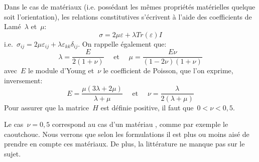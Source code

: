 \medskip
Dans le cas de matériaux  (i.e. possédant les mêmes
propriétés matérielles quelque soit l'orientation), les relations constitutives s'écrivent
à l'aide des coefficients de Lamé~$\lambda$ et~$\mu$:
\begin{equation}\sigma = 2\mu\varepsilon+\lambda Tr(\varepsilon)I\end{equation}
i.e.~$\sigma_{ij}=2\mu\varepsilon_{ij}+\lambda\varepsilon_{kk}\delta_{ij}$.
On rappelle également que:
\begin{equation}\lambda=\dfrac{E}{2(1+\nu)} \quad \text{ et } \quad \mu=\dfrac{E\nu}{(1-2\nu)(1+\nu)}
\end{equation}
avec~$E$ le module d'Young et~$\nu$ le coefficient de Poisson, que l'on exprime, inversement:
\begin{equation}
E=\dfrac{\mu(3\lambda+2\mu)}{\lambda+\mu} \quad\text{ et }\quad
\nu=\dfrac{\lambda}{2(\lambda+\mu)}
\end{equation}
Pour assurer que la matrice~$H$ est définie positive, il faut que~$0<\nu<0,5$.

\medskip
Le cas~$\nu=0,5$ correspond au cas d'un matériau , comme par
exemple le caoutchouc.
Nous verrons que selon les formulations il est plus ou moins aisé de prendre en compte
ces matériaux. De plus, la littérature ne manque pas sur le sujet.

